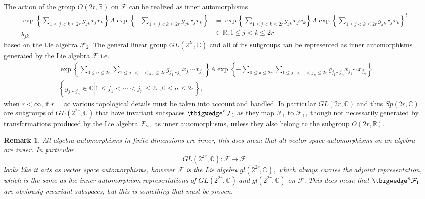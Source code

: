 \documentclass[aps,preprint]{revtex4}
\newtheorem{remark}[theorem]{Remark}
\begin{document}
The action of the group $O\left( 2r,\mathbb{R}\right) $ on $\mathcal{F}$ can
be realized as inner automorphisms 
\begin{align}
\exp\left\{ \sum_{1\leq j<k\leq2r}g_{jk}x_{j}x_{k}\right\} A\exp\left\{
-\sum_{1\leq j<k\leq2r}g_{jk}x_{j}x_{k}\right\} & =\exp\left\{ \sum_{1\leq
j<k\leq2r}g_{jk}x_{j}x_{k}\right\} A\exp\left\{ \sum_{1\leq
j<k\leq2r}g_{jk}x_{j}x_{k}\right\} ^{t} \\
g_{jk} & \in\mathbb{R},1\leq j<k\leq2r
\end{align}
based on the Lie algebra $\mathcal{F}_{2}.$ The general linear group $%
GL\left( 2^{2r},\mathbb{C}\right) $ and all of its subgroups can be
represented as inner automorphisms generated by the Lie algebra $\mathcal{F}$
i.e. 
\begin{align}
& \exp\left\{ \sum_{0\leq n\leq2r}\sum_{1\leq j_{1}<\cdots<j_{n}\leq
2r}g_{j_{1}\cdots j_{n}}x_{j_{1}}\cdots x_{j_{n}}\right\} A\exp\left\{
-\sum_{0\leq n\leq2r}\sum_{1\leq j_{1}<\cdots<j_{n}\leq2r}g_{j_{1}\cdots
j_{n}}x_{j_{1}}\cdots x_{j_{n}}\right\} , \\
& \left\{ \left. g_{j_{1}\cdots j_{n}}\in\mathbb{C}\right\vert 1\leq
j_{1}<\cdots<j_{n}\leq2r,0\leq n\leq2r\right\} ,
\end{align}
when $r<\infty$, if $r=\infty$ various topological details must be taken
into account and handled. In particular $GL\left( 2r,\mathbb{C}\right) $ and
thus $Sp\left( 2r,\mathbb{C}\right) $ are subgroups of $GL\left( 2^{2r},%
\mathbb{C}\right) $ that have invariant subspaces $\tbigwedge ^{n}\mathcal{F}%
_{1}$ as they map $\mathcal{F}_{1}$ to $\mathcal{F}_{1},$ though not
necessarily generated by transformations produced by the Lie algebra $%
\mathcal{F}_{2},$ as inner automorphisms, unless they also belong to the
subgroup $O\left( 2r,\mathbb{R}\right) $.

\begin{remark}
All algebra automorphisms in finite dimensions are inner, this does mean
that all vector space automorphisms on an algebra are inner. In particular 
\begin{equation}
GL\left( 2^{2r},\mathbb{C}\right) :\mathcal{F}\rightarrow \mathcal{F}
\end{equation}%
looks like it acts as vector space automorphisms, however $\mathcal{F}$ is
the Lie algebra $gl\left( 2^{2r},\mathbb{C}\right) ,$ which always carries
the adjoint representation$,$which is the same as the inner automorphism
representations of $GL\left( 2^{2r},\mathbb{C}\right) $ and $gl\left( 2^{2r},%
\mathbb{C}\right) $ on $\mathcal{F}.$ This does mean that $\tbigwedge^{n}%
\mathcal{F}_{1}$ are obviously invariant subspaces, but this is something
that must be proven.
\end{remark}
\end{document}
